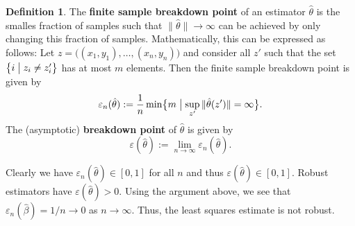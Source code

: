 \documentclass[
  a4paper,
]{article}
\theoremstyle{definition}
\newtheorem{definition}{Definition}[section]
\theoremstyle{definition}
\theoremstyle{definition}
\theoremstyle{definition}
\theoremstyle{remark}
\begin{document}
\begin{definition}
The \textbf{finite sample breakdown point} of an estimator \(\hat\theta\)
is the smalles fraction of samples such that
\(\|\hat\theta\| \to \infty\) can be achieved by only changing this
fraction of samples. Mathematically, this can be expressed as follows:
Let \(z = \bigl( (x_1, y_1), \ldots, (x_n, y_n) \bigr)\) and consider
all \(z'\) such that the set \(\bigl\{ i \bigm| z_i \neq z'_i \bigr\}\) has
at most \(m\) elements. Then the finite sample breakdown point
is given by
\begin{equation*}
  \varepsilon_n(\hat\theta)
  := \frac1n \min \bigl\{ m \bigm| \sup_{z'} \|\hat\theta(z')\| = \infty \bigr\}.
\end{equation*}
The (asymptotic) \textbf{breakdown point} of \(\hat\theta\) is given
by
\begin{equation*}
  \varepsilon(\hat\theta)
  := \lim_{n\to\infty} \varepsilon_n(\hat\theta).
\end{equation*}
\end{definition}

Clearly we have \(\varepsilon_n(\hat\theta) \in [0, 1]\) for all \(n\)
and thus \(\varepsilon(\hat\theta) \in [0, 1]\).
Robust estimators have \(\varepsilon(\hat\theta) > 0\).
Using the argument above, we see that \(\varepsilon_n(\hat\beta) = 1/n \to 0\)
as \(n\to \infty\). Thus, the least squares estimate is not robust.
\end{document}
